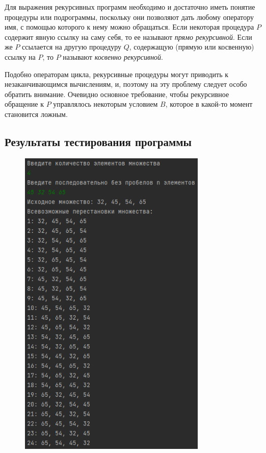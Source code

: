 \documentclass[bachelor, och, labwork]{shiza}
\begin{document}
Для выражения рекурсивных программ необходимо и достаточно иметь понятие
процедуры или подрограммы, поскольку они позволяют дать любому оператору имя,
с помощью которого к нему можно обращаться. Если некоторая процедура $P$
содержит явную ссылку на саму себя, то ее называют \textit{прямо рекурсивной}.
Если же $P$ ссылается на другую процедуру $Q$, содержащую (прямую или косвенную)
ссылку на $P$, то $P$ называют \textit{косвенно рекурсивной}.

Подобно операторам цикла, рекурсивные процедуры могут приводить к
незаканчивающимся вычислениям, и, поэтому на эту проблему следует особо обратить
внимание. Очевидно основное требование, чтобы рекурсивное обращение к $P$
управлялось некоторым условием $B$, которое в какой-то момент становится ложным.


\subsection{Результаты тестирования программы}

        \begin{figure}[H]
            \centering
            \includegraphics[width=0.8\textwidth]{1.png}
            \caption{}
        \end{figure}
\end{document}

